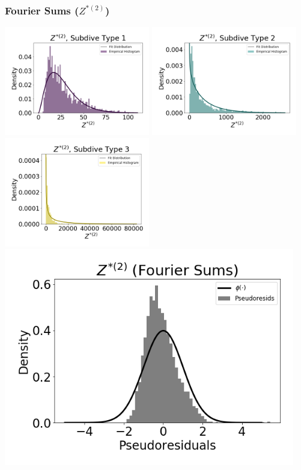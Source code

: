\documentclass[12pt]{TD-CJS}
\begin{document}
\newpage
\subsubsection{Fourier Sums ($Z^{*(2)}$)}

\includegraphics[width=2.5in]{../Plots/empirical_hist_ahat_0.png}
\includegraphics[width=2.5in]{../Plots/empirical_hist_ahat_1.png}
\includegraphics[width=2.5in]{../Plots/empirical_hist_ahat_2.png}
\includegraphics[width=5in]{../Plots/psedoresids_ahat.png}
\end{document}
